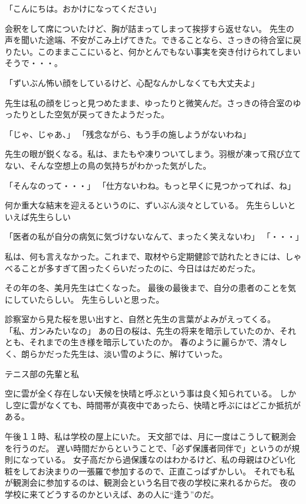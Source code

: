 「こんにちは。おかけになってください」

会釈をして席についたけど、胸が詰まってしまって挨拶すら返せない。
先生の声を聞いた途端、不安がこみ上げてきた。できることなら、さっきの待合室に戻りたい。このままここにいると、何かとんでもない事実を突き付けられてしまいそうで・・・。

「ずいぶん怖い顔をしているけど、心配なんかしなくても大丈夫よ」

先生は私の顔をじっと見つめたまま、ゆったりと微笑んだ。さっきの待合室のゆったりとした空気が戻ってきたようだった。

「じゃ、じゃあ、」
「残念ながら、もう手の施しようがないわね」

先生の眼が鋭くなる。私は、またもや凍りついてしまう。羽根が凍って飛び立てない、そんな空想上の鳥の気持ちがわかった気がした。

「そんなのって・・・」
「仕方ないわね。もっと早くに見つかってれば、ね」

何か重大な結末を迎えるというのに、ずいぶん淡々としている。
先生らしいといえば先生らしい

「医者の私が自分の病気に気づけないなんて、まったく笑えないわ」
「・・・」

私は、何も言えなかった。これまで、取材やら定期健診で訪れたときには、しゃべることが多すぎて困ったくらいだったのに、今日ははだめだった。

その年の冬、美月先生は亡くなった。
最後の最後まで、自分の患者のことを気にしていたらしい。
先生らしいと思った。

診察室から見た桜を思い出すと、自然と先生の言葉がよみがえってくる。
「私、ガンみたいなの」
あの日の桜は、先生の将来を暗示していたのか、それとも、それまでの生き様を暗示していたのか。
春のように麗らかで、清々しく、朗らかだった先生は、淡い雪のように、解けていった。







 テニス部の先輩と私

空に雲が全く存在しない天候を快晴と呼ぶという事は良く知られている。
しかし空に雲がなくても、時間帯が真夜中であったら、快晴と呼ぶにはどこか抵抗がある。

午後１１時、私は学校の屋上にいた。
天文部では、月に一度はこうして観測会を行うのだ。
遅い時間だからということで、「必ず保護者同伴で」というのが規則になっている。
女子高だから過保護なのはわかるけど、私の母親はひどい化粧をしてお決まりの一張羅で参加するので、正直こっぱずかしい。
それでも私が観測会に参加するのは、観測会という名目で夜の学校に来れるからだ。
夜の学校に来てどうするのかといえば、あの人に“逢う”のだ。

